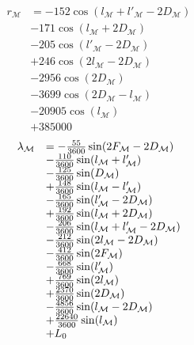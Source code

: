 \documentclass{article}
\begin{document}
\begin{equation}
\begin{array}{ll}
r_{{\mathcal M}} &= -152 \cos(l_{{{\mathcal M}}}+l'_{{{\mathcal M}}}-2 D_{{{\mathcal M}}})\\
&-171 \cos(l_{{{\mathcal M}}}+2 D_{{{\mathcal M}}})\\
&-205 \cos(l'_{{{\mathcal M}}}-2 D_{{{\mathcal M}}})\\
&+246 \cos(2 l_{{{\mathcal M}}}-2 D_{{{\mathcal M}}})\\
&-2956 \cos(2 D_{{{\mathcal M}}})\\
&-3699 \cos(2 D_{{{\mathcal M}}}-l_{{{\mathcal M}}}) \\
&-20905 \cos(l_{{{\mathcal M}}})\\
&+ 385000
\end{array}
\end{equation}
\begin{equation}
\begin{array}{ll}
\lambda_{\mathcal M} &= -{55\over 3600} \sin(2 F_{\mathcal M} - 2 D_{\mathcal M}) \\
&- {110\over 3600} \sin(l_{\mathcal M} + l'_{\mathcal M})\\
&- {125\over 3600} \sin(D_{\mathcal M})\\
&+ {148\over 3600} \sin(l_{\mathcal M} - l'_{\mathcal M})\\
&- {165\over 3600} \sin(l'_{\mathcal M} - 2 D_{\mathcal M})\\
&+ {192\over 3600} \sin(l_{\mathcal M} + 2 D_{\mathcal M})\\
&- {206\over 3600} \sin(l_{\mathcal M} + l'_{\mathcal M} - 2 D_{\mathcal M})\\
&- {212\over 3600} \sin(2 l_{\mathcal M} - 2 D_{\mathcal M}) \\
&- {412\over 3600} \sin(2 F_{\mathcal M})\\
&- {668\over 3600} \sin(l'_{\mathcal M}) \\
&+ {769\over 3600} \sin(2 l_{\mathcal M})\\
&+ {2370\over 3600} \sin(2 D_{\mathcal M})\\
&- {4856\over 3600} \sin(l_{\mathcal M} - 2 D_{\mathcal M}) \\
&+ {22640\over 3600} \sin(l_{\mathcal M})\\
&+ L_0
\end{array}
\end{equation}
\end{document}
